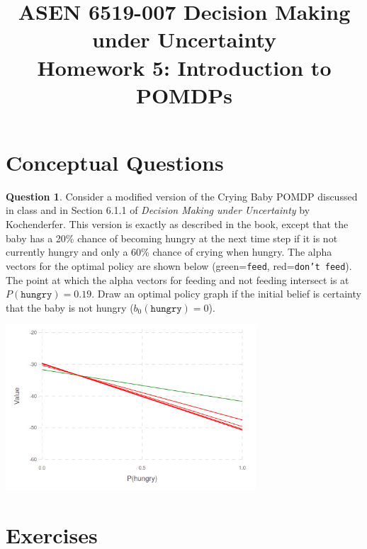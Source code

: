 \documentclass{article}
\title{ASEN 6519-007 Decision Making under Uncertainty\\
       Homework 5: Introduction to POMDPs}
\theoremstyle{definition}
\newtheorem{question}[thm]{Question}
\begin{document}
\maketitle

\section{Conceptual Questions}

\begin{question}
    Consider a modified version of the Crying Baby POMDP discussed in class and in Section 6.1.1 of \emph{Decision Making under Uncertainty} by Kochenderfer. This version is exactly as described in the book, except that the baby has a 20\% chance of becoming hungry at the next time step if it is not currently hungry and only a 60\% chance of crying when hungry. The alpha vectors for the optimal policy are shown below (green=\texttt{feed}, red=\texttt{don't feed}). The point at which the alpha vectors for feeding and not feeding intersect is at $P(\texttt{hungry}) = 0.19$. Draw an optimal policy graph if the initial belief is certainty that the baby is not hungry ($b_0(\texttt{hungry}) = 0$).

\begin{center}
    \includegraphics[width=0.7\textwidth]{alphas.png}
\end{center}

\end{question}

\pagebreak

\section{Exercises}
\end{document}
